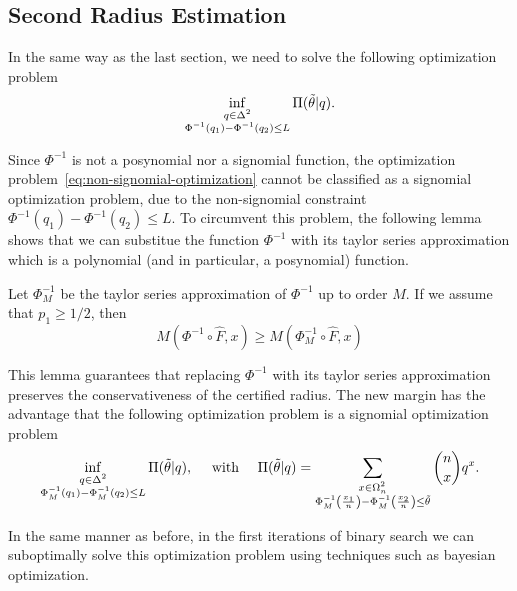 \subsection{Second Radius Estimation}\label{subsec:second-radius-estimation}
In the same way as the last section, we need to solve the following optimization problem
\begin{equation}
    \inf_{\substack{q\in\Delta^{2}\\\Phi^{-1}(q_1)-\Phi^{-1}(q_2)\leq L}}\Pi(\Tilde{\theta}|q).\label{eq:non-signomial-optimization}
\end{equation}

Since $\Phi^{-1}$ is not a posynomial nor a signomial function, the optimization problem~\eqref{eq:non-signomial-optimization} cannot be classified as a signomial optimization problem, due to the non-signomial constraint $\Phi^{-1}(q_1)-\Phi^{-1}(q_2)\leq L$.
To circumvent this problem, the following lemma shows that we can substitue the function $\Phi^{-1}$ with its taylor series approximation which is a polynomial (and in particular, a posynomial) function.
\begin{lemma}
    \label{lemma:approximation}
    Let $\Phi^{-1}_M$ be the taylor series approximation of $\Phi^{-1}$ up to order $M$.
    If we assume that $p_1\geq1/2$, then
    \[
        M(\Phi^{-1}\circ\hat{F},x) \geq M(\Phi^{-1}_M\circ\hat{F},x)
    \]
\end{lemma}
This lemma guarantees that replacing $\Phi^{-1}$ with its taylor series approximation preserves the conservativeness of the certified radius.
The new margin has the advantage that the following optimization problem is a signomial optimization problem
\begin{equation}
    \inf_{\substack{q\in\Delta^{2}\\\Phi^{-1}_M(q_1)-\Phi^{-1}_M(q_2)\leq L}}\Pi(\Tilde{\theta}|q),\quad\text{ with }\quad\Pi(\Tilde{\theta}|q)= \sum_{\substack{x\in\Omega^{2}_n\\\Phi^{-1}_M\left(\frac{x_1}{n}\right)-\Phi^{-1}_M\left(\frac{x_2}{n}\right)\leq\Tilde{\theta}}}\binom{n}{x}q^x.\label{eq:approximated-signomial-optimization}
\end{equation}

In the same manner as before, in the first iterations of binary search we can suboptimally solve this optimization problem using techniques such as bayesian optimization.

